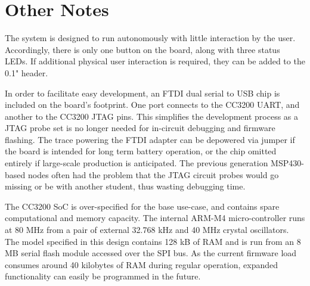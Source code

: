 \section{Other Notes}

The system is designed to run autonomously with little interaction by the user. Accordingly, there is only one button on the board, along with three status LEDs. If additional physical user interaction is required, they can be added to the 0.1" header. 

In order to facilitate easy development, an FTDI dual serial to USB chip is included on the board's footprint. One port connects to the CC3200 UART, and another to the CC3200 JTAG pins. This simplifies the development process as a JTAG probe set is no longer needed for in-circuit debugging and firmware flashing. The trace powering the FTDI adapter can be depowered via jumper if the board is intended for long term battery operation, or the chip omitted entirely if large-scale production is anticipated. The previous generation MSP430-based nodes often had the problem that the JTAG circuit probes would go missing or be with another student, thus wasting debugging time.

The CC3200 SoC is over-specified for the base use-case, and contains spare computational and memory capacity. The internal ARM-M4 micro-controller runs at 80 MHz from a pair of external 32.768 kHz and 40 MHz crystal oscillators. The model specified in this design contains 128 kB of RAM and is run from an 8 MB serial flash module accessed over the SPI bus. As the current firmware load consumes around 40 kilobytes of RAM during regular operation, expanded functionality can easily be programmed in the future.


